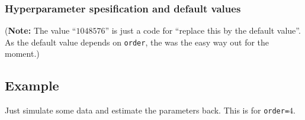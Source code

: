 \documentclass[a4paper,11pt]{article}
\begin{document}
\subsubsection*{Hyperparameter spesification and default values}

(\textbf{Note:} The value ``$1048576$'' is just a code for ``replace
this by the default value''. As the default value depends on
\texttt{order}, the was the easy way out for the moment.)




\subsection*{Example}

Just simulate some data and estimate the parameters back. This is for
\texttt{order=}$4$.

{\small}
\end{document}
